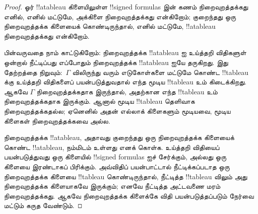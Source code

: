 \documentclass[../../../include/open-logic-section]{subfiles}
\begin{document}
\begin{proof}
ஓர் !!a{tableau} கிளையிலுள்ள !!{signed formula}s இன் கணம்
நிறைவுறத்தக்கது எனில், எனில் மட்டுமே, அக்கிளை நிறைவுறத்தக்கது என்கிறோம்;
குறைந்தது ஒரு நிறைவுறத்தக்க கிளையைக் கொண்டிருந்தால், எனில் மட்டுமே,
!!a{tableau} நிறைவுறத்தக்கது என்கிறோம்.

பின்வருவதை நாம் காட்டுகிறோம்: நிறைவுறத்தக்க !!a{tableau} ஐ உய்த்தறி
விதிகளுள் ஒன்றால் நீட்டிப்பது எப்போதும் நிறைவுறத்தக்க !!a{tableau} ஐயே
தருகிறது. இது தேற்றத்தை நிறுவும்:~$\Gamma$ விலிருந்து வரும் எடுகோள்களை
மட்டுமே கொண்ட !!{tableau} க்கு உய்த்தறி விதிகளைப் பயன்படுத்துவதால் எந்த
மூடிய !!{tableau} உம் கிடைக்கிறது. ஆகவே $\Gamma$ நிறைவுறத்தக்கதாக இருந்தால்,
அதற்கான எந்த !!{tableau} உம் நிறைவுறத்தக்கதாக இருக்கும். ஆனால் மூடிய
!!{tableau} தெளிவாக நிறைவுறத்தக்கதல்ல; ஏனெனில் அதன் எல்லாக் கிளைகளும்
மூடியவை, மூடிய கிளைகள் நிறைவுறத்தக்கவை அல்ல.

நிறைவுறத்தக்க !!a{tableau}, அதாவது குறைந்தது ஒரு நிறைவுறத்தக்க கிளையைக்
கொண்ட !!a{tableau}, நம்மிடம் உள்ளது எனக் கொள்க. உய்த்தறி விதியைப் பயன்படுத்துவது ஒரு கிளையில்
!!{signed formula}s ஐச் சேர்க்கும், அல்லது ஒரு கிளையை இரண்டாகப் பிரிக்கும்.
அவ்விதிப் பயன்பாட்டால் நீட்டிக்கப்படாத ஒரு நிறைவுறத்தக்க கிளையை
!!{tableau} கொண்டிருந்தால், நீட்டித்த !!{tableau} விலும் அது நிறைவுறத்தக்க
கிளையாகவே இருக்கும்; எனவே நீட்டித்த அட்டவணை மரம் நிறைவுறத்தக்கது. ஆகவே
நிறைவுறத்தக்க கிளைக்கே விதி பயன்படுத்தப்படும் நேர்வை மட்டும் கருத வேண்டும்.


\end{proof}
\end{document}
